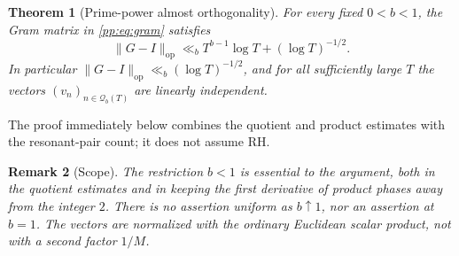 \documentclass[11pt,reqno]{amsart}
\numberwithin{equation}{section}
\newtheorem{theorem}{Theorem}[section]
\newtheorem{remark}[theorem]{Remark}
\begin{document}
\begin{theorem}[Prime-power almost orthogonality]\label{pp:thm:main}
For every fixed $0<b<1$, the Gram matrix in \eqref{pp:eq:gram} satisfies
\begin{equation}
\boxed{\quad\|G-I\|_{\mathrm{op}}
\ll_b T^{b-1}\log T+(\log T)^{-1/2}.\quad}
\label{pp:eq:main}
\end{equation}
In particular $\|G-I\|_{\mathrm{op}}\ll_b(\log T)^{-1/2}$, and for all sufficiently large $T$ the vectors $(v_n)_{n\in\mathcal Q_b(T)}$ are linearly independent.
\end{theorem}
The proof immediately below combines the quotient and product estimates with the resonant-pair count; it does not assume RH.

\begin{remark}[Scope]
The restriction $b<1$ is essential to the argument, both in the quotient estimates and in keeping the first derivative of product phases away from the integer $2$. There is no assertion uniform as $b\uparrow1$, nor an assertion at $b=1$. The vectors are normalized with the ordinary Euclidean scalar product, not with a second factor $1/M$.
\end{remark}
\end{document}

